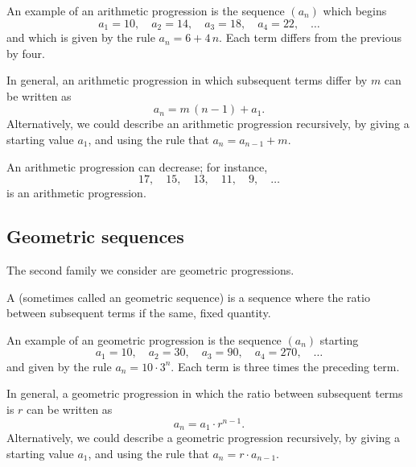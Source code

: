 \begin{example}
  An example of an arithmetic progression is the sequence $(a_n)$ which begins 
  $$
  a_1 = 10, \quad a_2 = 14, \quad a_3 = 18, \quad a_4 = 22, \quad\ldots
  $$
  and which is given by the rule $a_n = 6 + 4 \, n$.  Each term differs
  from the previous by four.
\end{example}

In general, an arithmetic progression in which subsequent terms differ
by $m$ can be written as
$$
a_n = m \, (n-1) + a_1.
$$
Alternatively, we could describe an arithmetic progression
recursively, by giving a starting value $a_1$, and using the rule that
$a_{n} = a_{n-1} + m$.


An arithmetic progression can decrease; for instance,
$$
17,\quad  15,\quad  13,\quad  11,\quad  9, \quad\ldots
$$
is an arithmetic progression.

\subsection{Geometric sequences}
\label{subsection:geometric-sequences}

The second family we consider are geometric progressions.

\begin{definition}
  A  (sometimes called an geometric
  sequence) is a sequence where the ratio
  between subsequent terms if the same, fixed quantity.
\end{definition}

\begin{example}
  An example of an geometric progression is the sequence $(a_n)$ starting
  $$
  a_1 = 10, \quad a_2 = 30, \quad a_3 = 90, \quad a_4 = 270, \quad\ldots
  $$
  and given by the rule $a_n = 10 \cdot 3^n$.  Each term is three
  times the preceding term.
\end{example}

In general, a geometric progression in which the ratio between
subsequent terms is $r$ can be written as
$$
a_n = a_1 \cdot r^{n-1}.
$$
Alternatively, we could describe a geometric progression
recursively, by giving a starting value $a_1$, and using the rule that
$a_{n} = r \cdot a_{n-1}$.

